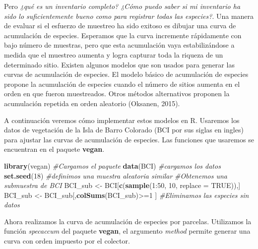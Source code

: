\documentclass[]{book}
\newenvironment{Shaded}{\begin{snugshade}}{\end{snugshade}}
\newcommand{\KeywordTok}[1]{\textcolor[rgb]{0.13,0.29,0.53}{\textbf{{#1}}}}
\newcommand{\DataTypeTok}[1]{\textcolor[rgb]{0.13,0.29,0.53}{{#1}}}
\newcommand{\DecValTok}[1]{\textcolor[rgb]{0.00,0.00,0.81}{{#1}}}
\newcommand{\StringTok}[1]{\textcolor[rgb]{0.31,0.60,0.02}{{#1}}}
\newcommand{\CommentTok}[1]{\textcolor[rgb]{0.56,0.35,0.01}{\textit{{#1}}}}
\newcommand{\OtherTok}[1]{\textcolor[rgb]{0.56,0.35,0.01}{{#1}}}
\newcommand{\NormalTok}[1]{{#1}}
\begin{document}
Pero \emph{¿qué es un inventario completo? ¿Cómo puedo saber si mi
inventario ha sido lo suficientemente bueno como para registrar todas
las especies?}. Una manera de evaluar si el esfuerzo de muestreo ha sido
exitoso es dibujar una curva de acumulación de especies. Esperamos que
la curva incremente rápidamente con bajo número de muestras, pero que
esta acumulación vaya estabilizándose a medida que el muestreo aumenta y
logra capturar toda la riqueza de un determinado sitio. Existen algunos
modelos que son usados para generar las curvas de acumulación de
especies. El modelo básico de acumulación de especies propone la
acumulación de especies cuando el número de sitios aumenta en el orden
en que fueron muestreados. Otros métodos alternativos proponen la
acumulación repetida en orden aleatorio (Oksanen, 2015).

A continuación veremos cómo implementar estos modelos en R. Usaremos los
datos de vegetación de la Isla de Barro Colorado (BCI por sus siglas en
ingles) para ajustar las curvas de acumulación de especies. Las
funciones que usaremos se encuentran en el paquete \textbf{vegan}.

\begin{Shaded}
\begin{Highlighting}[]
\KeywordTok{library}\NormalTok{(vegan) }\CommentTok{#Cargamos el paquete}
\KeywordTok{data}\NormalTok{(BCI) }\CommentTok{#cargamos los datos}
\KeywordTok{set.seed}\NormalTok{(}\DecValTok{18}\NormalTok{) }\CommentTok{#definimos una muestra aleatoria similar}
\CommentTok{#Obtenemos una submuestra de BCI}
\NormalTok{BCI_sub <-}\StringTok{ }\NormalTok{BCI[}\KeywordTok{c}\NormalTok{(}\KeywordTok{sample}\NormalTok{(}\DecValTok{1}\NormalTok{:}\DecValTok{50}\NormalTok{, }\DecValTok{10}\NormalTok{, }\DataTypeTok{replace =} \OtherTok{TRUE}\NormalTok{)),]}
\NormalTok{BCI_sub <-}\StringTok{ }\NormalTok{BCI_sub[,}\KeywordTok{colSums}\NormalTok{(BCI_sub)>=}\DecValTok{1} \NormalTok{] }
\CommentTok{#Eliminamos las especies sin datos}
\end{Highlighting}
\end{Shaded}

Ahora realizamos la curva de acumulación de especies por parcelas.
Utilizamos la función \emph{specaccum} del paquete \textbf{vegan}, el
argumento \emph{method} permite generar una curva con orden impuesto por
el colector.

\begin{Shaded}
\end{Shaded}
\end{document}
